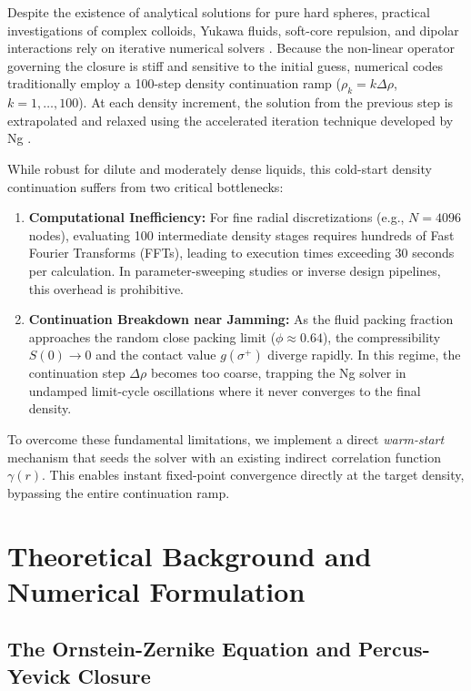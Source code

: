 \documentclass[11pt,a4paper]{article}
\begin{document}
Despite the existence of analytical solutions for pure hard spheres, practical investigations of complex colloids, Yukawa fluids, soft-core repulsion, and dipolar interactions rely on iterative numerical solvers \cite{ng1974hypernetted}. Because the non-linear operator governing the closure is stiff and sensitive to the initial guess, numerical codes traditionally employ a 100-step density continuation ramp ($\rho_k = k \Delta \rho$, $k = 1, \dots, 100$). At each density increment, the solution from the previous step is extrapolated and relaxed using the accelerated iteration technique developed by Ng \cite{ng1974hypernetted}.

While robust for dilute and moderately dense liquids, this cold-start density continuation suffers from two critical bottlenecks:
\begin{enumerate}
    \item \textbf{Computational Inefficiency:} For fine radial discretizations (e.g., $N = 4096$ nodes), evaluating 100 intermediate density stages requires hundreds of Fast Fourier Transforms (FFTs), leading to execution times exceeding 30 seconds per calculation. In parameter-sweeping studies or inverse design pipelines, this overhead is prohibitive.
    \item \textbf{Continuation Breakdown near Jamming:} As the fluid packing fraction approaches the random close packing limit ($\phi \approx 0.64$), the compressibility $S(0) \to 0$ and the contact value $g(\sigma^+)$ diverge rapidly. In this regime, the continuation step $\Delta \rho$ becomes too coarse, trapping the Ng solver in undamped limit-cycle oscillations where it never converges to the final density.
\end{enumerate}

To overcome these fundamental limitations, we implement a direct \textit{warm-start} mechanism that seeds the solver with an existing indirect correlation function $\gamma(r)$. This enables instant fixed-point convergence directly at the target density, bypassing the entire continuation ramp.

\section{Theoretical Background and Numerical Formulation}

\subsection{The Ornstein-Zernike Equation and Percus-Yevick Closure}
\end{document}
